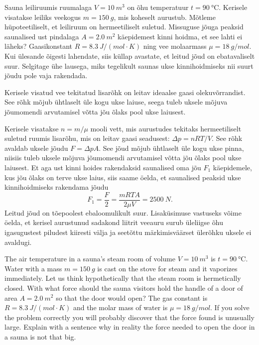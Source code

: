 
Sauna leiliruumis ruumalaga $V=\SI{10}{m^3}$ on õhu temperatuur $t=\SI{90}{\degreeCelsius}$. Kerisele visatakse leiliks veekogus $m=\SI{150}{g}$, mis koheselt aurustub. Mõtleme hüpoteetiliselt, et leiliruum on hermeetiliselt suletud. Missuguse jõuga peaksid saunalised ust pindalaga $A=\SI{2,0}{m^2}$ käepidemest kinni hoidma, et see lahti ei läheks? Gaasikonstant $R=\SI{8.3}{J \per (mol\!\cdot\! K)}$ ning vee molaarmass $\mu=\SI{18}{g\per mol}$. Kui ülesande õigesti lahendate, siis küllap avastate, et leitud jõud on ebatavaliselt suur. Selgitage ühe lausega, miks tegelikult saunas ukse kinnihoidmiseks nii suurt jõudu pole vaja rakendada.

\hint
Kerisele visatud vee tekitatud lisarõhk on leitav ideaalse gaasi olekuvõrrandist. See rõhk mõjub ühtlaselt üle kogu ukse laiuse, seega tuleb uksele mõjuva jõumomendi arvutamisel võtta jõu õlaks pool ukse laiusest.

\solu
Kerisele visatakse $n=m/\mu$ mooli vett, mis aurustudes tekitaks hermeetiliselt suletud ruumis lisarõhu, mis on leitav gaasi seadusest: $\Delta p = nRT/V$. See rõhk avaldab uksele jõudu $F=\Delta p A$. See jõud mõjub ühtlaselt üle kogu ukse pinna, niisiis tuleb uksele mõjuva jõumomendi arvutamisel võtta jõu õlaks pool ukse laiusest. Et aga ust kinni hoides rakendaksid saunalised oma jõu $F_1$ käepidemele, kus jõu õlaks on terve ukse laius, siis saame öelda, et saunalised peaksid ukse kinnihoidmiseks rakendama jõudu
\[F_1 = \frac{F}{2} = \frac{mRTA}{2 \mu V} = \SI{2500}{N}.\]
Leitud jõud on tõepoolest ebaloomulikult suur. Lisaküsimuse vastuseks võime öelda, et kerisel aurustunud sadakond liitrit veeauru surub üleliigse õhu igasugustest piludest kiiresti välja ja seetõttu märkimisväärset ülerõhku uksele ei avaldugi.

The air temperature in a sauna’s steam room of volume $V=\SI{10}{m^3}$ is $t=\SI{90}{\degreeCelsius}$. Water with a mass $m=\SI{150}{g}$ is cast on the stove for steam and it vaporizes immediately. Let us think hypothetically that the steam room is hermetically closed. With what force should the sauna visitors hold the handle of a door of area $A=\SI{2,0}{m^2}$ so that the door would open? The gas constant is $R=\SI{8.3}{J \per (mol\!\cdot\! K)}$ and the molar mass of water is $\mu=\SI{18}{g\per mol}$. If you solve the problem correctly you will probably discover that the force found is unusually large. Explain with a sentence why in reality the force needed to open the door in a sauna is not that big.

